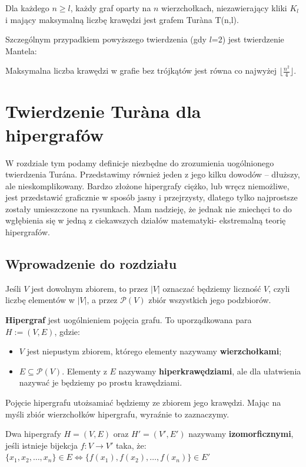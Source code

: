 \documentclass[miz,woman]{mgrwms}
\begin{document}
\begin{tw}
 Dla każdego $n\geq l$, każdy graf oparty na $n$ wierzchołkach, niezawierający  kliki $K_l$ i mający maksymalną
liczbę krawędzi jest grafem Tur\`ana T(n,l).
\end{tw}
Szczególnym przypadkiem powyższego twierdzenia (gdy $l$=2) jest twierdzenie Mantela:
\begin{tw}
 Maksymalna liczba krawędzi w grafie bez trójkątów jest równa co najwyżej $\lfloor \frac{n^2}{4} \rfloor$.
\end{tw}

\newpage


\chapter{Twierdzenie Tur\`{a}na dla hipergrafów}
W rozdziale tym podamy definicje niezbędne do zrozumienia uogólnionego twierdzenia Tur\'ana. Przedstawimy również jeden z
jego kilku dowodów -- dłuższy, ale nieskomplikowany. Bardzo złożone hipergrafy ciężko, lub wręcz niemożliwe,
jest przedstawić graficznie w sposób jasny i przejrzysty, dlatego tylko najprostsze zostały umieszczone na rysunkach. 
Mam nadzieję, że jednak nie zniechęci to do wgłębienia się w jedną z ciekawszych działów matematyki- ekstremalną 
teorię hipergrafów. 
\section{Wprowadzenie do rozdziału}

Jeśli $V$ jest dowolnym zbiorem, to przez $|V|$ oznaczać będziemy liczność $V$, czyli liczbę elementów w $|V|$,
a przez $\mathcal{P}(V)$ zbiór wszystkich jego podzbiorów.\\
\begin{defi}
 \textbf{Hipergraf} jest uogólnieniem pojęcia grafu. To uporządkowana para \\
$H:=(V,E)$, gdzie:
\begin{itemize}
\item $V$ jest niepustym zbiorem, którego elementy nazywamy \textbf{wierzchołkami};
\item $E \subseteq \mathcal{P}(V)$. Elementy z $E$ nazywamy \textbf{hiperkrawędziami}, ale  dla ułatwienia nazywać je będziemy
po prostu krawędziami.
\end{itemize}
\end{defi}
Pojęcie hipergrafu utożsamiać będziemy ze zbiorem jego krawędzi. Mając na myśli zbiór wierzchołków hipergrafu, wyraźnie
to zaznaczymy. \\
\begin{defi}
 Dwa hipergrafy $H=(V,E)$ oraz $H'=(V',E')$ nazywamy \textbf{izomorficznymi}, jeśli istnieje bijekcja $f:V\rightarrow V'$
taka, że:\\
 $\{x_1,x_2,\dots,x_n\} \in E \Longleftrightarrow \{f(x_1),f(x_2),\dots,f(x_n)\} \in E'$
\end{defi}
\end{document}
